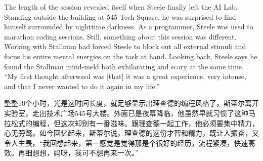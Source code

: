 \ifdefined\eng
The length of the session revealed itself when Steele finally left the AI Lab. Standing outside the building at 545 Tech Square, he was surprised to find himself surrounded by nighttime darkness. As a programmer, Steele was used to marathon coding sessions. Still, something about this session was different. Working with Stallman had forced Steele to block out all external stimuli and focus his entire mental energies on the task at hand. Looking back, Steele says he found the Stallman mind-meld both exhilarating and scary at the same time. ``My first thought afterward was [that] it was a great experience, very intense, and that I never wanted to do it again in my life.''
\fi

\ifdefined\chs
整整10个小时，光是这时间长度，就足够显示出理查德的编程风格了。斯蒂尔离开实验室，走出技术广场545号大楼。外面已是夜幕降临，他虽然早就习惯了这种马拉松式的编程，但这次却别有一番滋味。跟理查德一起工作，他必须要集中精力，心无旁鹜。如今回忆起来，斯蒂尔说，理查德的这份才智和精力，既让人振奋，又令人生畏。“我回想起来，第一感觉是觉得那是个很好的经历，流程紧凑，快速高效。再细想想，妈呀，我可不想再来一次。”
\fi

\theendnotes
\setcounter{endnote}{0}
